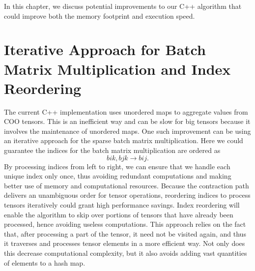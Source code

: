 In this chapter, we discuss potential improvements to our C++ algorithm that could
improve both the memory footprint and execution speed.

\section{Iterative Approach for Batch Matrix Multiplication and Index Reordering}
The current C++ implementation uses unordered maps to aggregate values from COO tensors.
This is an inefficient way and can be slow for big tensors because it involves the
maintenance of unordered maps. One such improvement can be using an iterative approach
for the sparse batch matrix multiplication. Here we could guarantee the indices for the batch
matrix multiplication are ordered as
\begin{equation*}
    bik, bjk \rightarrow bij.
\end{equation*}
By processing indices from left to right, we can ensure that we handle each unique index
only once, thus avoiding redundant computations and making better use of memory and
computational resources. Because the contraction path delivers an unambiguous order for
tensor operations, reordering indices to process tensors iteratively could grant high
performance savings. Index reordering will enable the algorithm to skip over portions
of tensors that have already been processed, hence avoiding useless computations. This
approach relies on the fact that, after processing a part of the tensor, it need not be visited
again, and thus it traverses and processes tensor elements in a more efficient way. Not
only does this decrease computational complexity, but it also avoids adding vast quantities
of elements to a hash map.

